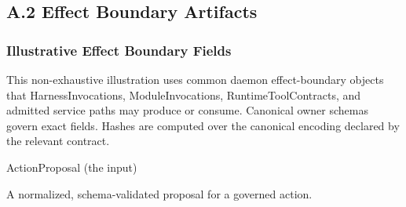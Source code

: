 \documentclass[
  11pt,
]{article}
\begin{document}
\begin{center}
\end{center}


\hypertarget{a.2-effect-boundary-artifacts}{%
\subsection{A.2 Effect Boundary Artifacts}\label{a.2-effect-boundary-artifacts}}

\hypertarget{normative-schema-firewall-artifacts-1}{%
\subsubsection{Illustrative Effect Boundary
Fields}\label{normative-schema-firewall-artifacts-1}}

This non-exhaustive illustration uses common daemon effect-boundary objects
that HarnessInvocations, ModuleInvocations, RuntimeToolContracts, and admitted
service paths may produce or consume.
Canonical owner schemas govern exact fields. Hashes are computed over
the canonical encoding declared by the relevant contract.

ActionProposal (the input)

A normalized, schema-validated proposal for a governed action.
\end{document}
